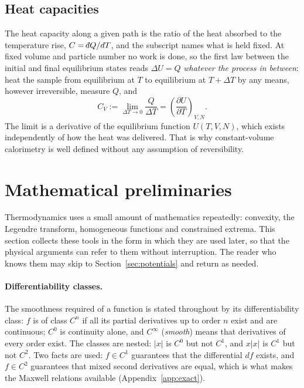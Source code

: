 \documentclass[10pt,a4paper]{article}
\theoremstyle{remark}
\newcommand{\dbar}{\mathchar'26\mkern-11mu d}
\begin{document}
\subsection{Heat capacities}
\label{sec:heatcap}

The heat capacity along a given path is the ratio of the heat absorbed to the
temperature rise, $C=\dbar Q/dT$, and the subscript names what is held fixed.
At fixed volume and particle number no work is done, so the first law between
the initial and final equilibrium states reads $\Delta U=Q$ \emph{whatever the
process in between}: heat the sample from equilibrium at $T$ to equilibrium at
$T+\Delta T$ by any means, however irreversible, measure $Q$, and
\[
  C_V := \lim_{\Delta T\to0}\frac{Q}{\Delta T}
  = \left(\frac{\partial U}{\partial T}\right)_{V,N} .
\]
The limit is a derivative of the equilibrium function $U(T,V,N)$, which exists
independently of how the heat was delivered. That is why constant-volume
calorimetry is well defined without any assumption of reversibility.

\section{Mathematical preliminaries}
\label{sec:math}

Thermodynamics uses a small amount of mathematics repeatedly: convexity,
the Legendre transform, homogeneous functions and constrained extrema. This
section collects these tools in the form in which they are used later, so that
the physical arguments can refer to them without interruption. The reader who
knows them may skip to Section~\ref{sec:potentials} and return as needed.

\paragraph{Differentiability classes.} The smoothness required of a function
is stated throughout by its differentiability class: $f$ is of class $C^{n}$
if all its partial derivatives up to order $n$ exist and are continuous;
$C^{0}$ is continuity alone, and $C^{\infty}$ (\emph{smooth}) means that
derivatives of every order exist. The classes are nested: $|x|$ is $C^{0}$ but
not $C^{1}$, and $x|x|$ is $C^{1}$ but not $C^{2}$. Two facts are used:
$f\in C^{1}$ guarantees that the differential $df$ exists, and $f\in C^{2}$
guarantees that mixed second derivatives are equal, which is what makes the
Maxwell relations available (Appendix~\ref{app:exact}).
\end{document}
